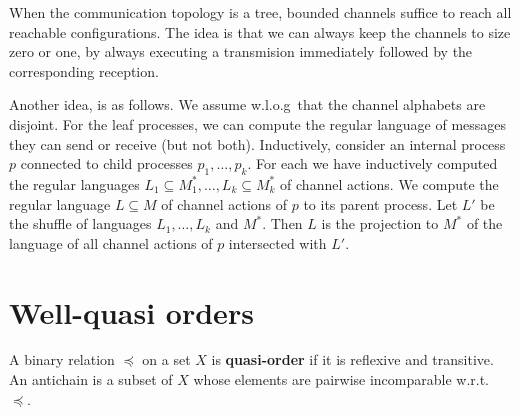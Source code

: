 \begin{solution}
	When the communication topology is a tree,
	bounded channels suffice to reach all reachable configurations.
	The idea is that we can always keep the channels to size zero or one,
	by always executing a transmision immediately followed by the corresponding reception.

    Another idea, is as follows.
    We assume w.l.o.g~that the channel alphabets are disjoint.
    For the leaf processes, we can compute the regular language of messages they can send or receive (but not both).
    Inductively, consider an internal process $p$ connected to child processes $p_1, \dots, p_k$.
    For each we have inductively computed the regular languages $L_1 \subseteq M_1^*, \dots, L_k \subseteq M_k^*$ of channel actions.
    We compute the regular language $L \subseteq M$ of channel actions of $p$ to its parent process.
    Let $L'$ be the shuffle of languages $L_1, \dots, L_k$ and $M^*$.
    Then $L$ is the projection to $M^*$
    of the language of all channel actions of $p$ intersected with $L'$.
\end{solution}

\section*{Well-quasi orders}

A binary relation $\preceq$ on a set $X$ 
is \textbf{quasi-order}
if it is reflexive and transitive.
An antichain is a subset of $X$ 
whose elements are pairwise incomparable w.r.t.~$\preceq$.

